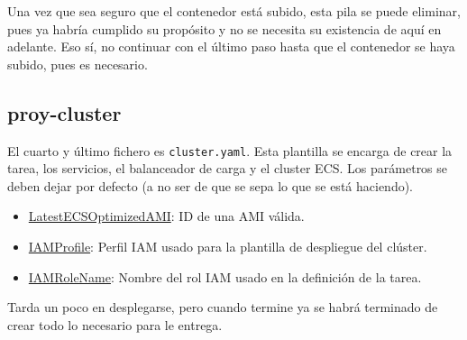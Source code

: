 Una vez que sea seguro que el contenedor está subido, esta pila se puede eliminar, pues ya habría cumplido su propósito y no se necesita su existencia de aquí en adelante. Eso sí, no continuar con el último paso hasta que el contenedor se haya subido, pues es necesario.

\subsection{proy-cluster}

El cuarto y último fichero es \texttt{cluster.yaml}. Esta plantilla se encarga de crear la tarea, los servicios, el balanceador de carga y el cluster ECS. Los parámetros se deben dejar por defecto (a no ser de que se sepa lo que se está haciendo).

\begin{itemize}
    \item \underline{LatestECSOptimizedAMI}: ID de una AMI válida.
    \item \underline{IAMProfile}: Perfil IAM usado para la plantilla de despliegue del clúster.
    \item \underline{IAMRoleName}: Nombre del rol IAM usado en la definición de la tarea.
\end{itemize}

Tarda un poco en desplegarse, pero cuando termine ya se habrá terminado de crear todo lo necesario para le entrega.
